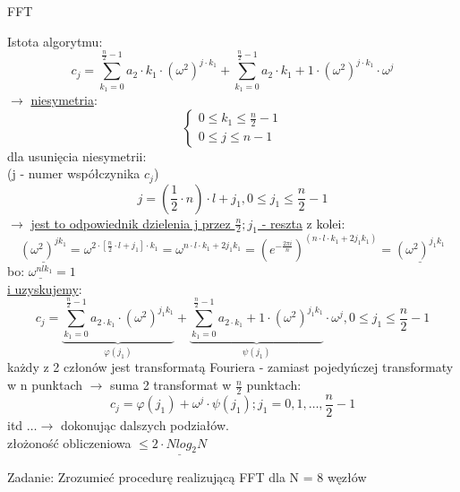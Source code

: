\begin{frame}[allowframebreaks]{FFT}
\begin{block}{Istota algorytmu:}
	\[
		c_j = \sum\limits_{k_1=0}^{\frac{n}{2} - 1} a_2 \cdot k_1 \cdot (\omega^2)^{j \cdot k_1} + \sum\limits_{k_1 = 0}^{\frac{n}{2} - 1} a_2 \cdot k_1 + 1 \cdot (\omega^2)^{j \cdot k_1} \cdot \omega^j
		\tag{16.24}
	\]
	\blockbreak
	$\to$ \underline{niesymetria}: \\
	\[
	\begin{cases}
		0 \leq k_1 \leq \frac{n}{2} - 1 \\
		0 \leq j \leq n-1
	\end{cases}
	\tag{16.25}
	\]
	dla usunięcia niesymetrii: \\
	(j - numer współczynika $c_j$)
	\[
		j = (\frac{1}{2} \cdot n) \cdot l + j_1, 0 \leq j_1 \leq \frac{n}{2} - 1
	\]
	$\to$ \underline{jest to odpowiednik dzielenia j przez $\frac{n}{2} ; j_1$ - reszta}
	\blockbreak
	z kolei:
	\[
		\underline{(\omega^2)^{jk_1}} = \omega^{2 \cdot [\frac{n}{2} \cdot l + j_1] \cdot k_1} = \omega^{n \cdot l \cdot k_1 + 2j_1k_1} = (e^{-\frac{2\pi i}{n}})^{(n \cdot l \cdot k_1 + 2j_1k_1)} = \underline{(\omega^2)^{j_1k_1}}
		\tag{16.26}
	\]
	bo: $\underline{\omega^{nlk_1}} = 1$ \\
	\underline{i uzyskujemy}:
	\[
		c_j = \underbrace{\sum\limits_{k_1 = 0}^{\frac{n}{2} - 1} a_{2 \cdot k_1} \cdot (\omega^2)^{j_1k_1}}_{\varphi(j_1)} + \underbrace{ \sum\limits_{k_1 = 0}^{\frac{n}{2}-1} a_{2 \cdot k_1} + 1 \cdot (\omega^2)^{j_1k_1}}_{\psi(j_1)} \cdot \omega^j, 0\leq j_1 \leq \frac{n}{2} - 1
		\tag{16.27}
	\]
	\blockbreak
	każdy z 2 członów jest transformatą Fouriera - zamiast pojedyńczej transformaty w n punktach $\to$ suma 2 transformat w $\frac{n}{2}$ punktach:
	\[
		c_j = \varphi(j_1) + \omega^j \cdot \psi(j_1) ; j_1 = 0, 1, \dots, \frac{n}{2} - 1
		\tag{16.28}
	\]
	itd $\dots \to$ dokonując dalszych podziałów. \\
	złożoność obliczeniowa $\leq \underline{2 \cdot Nlog_2N}$ \\
	\end{block}
	Zadanie: Zrozumieć procedurę realizującą FFT dla N = 8 węzłów
\end{frame}   